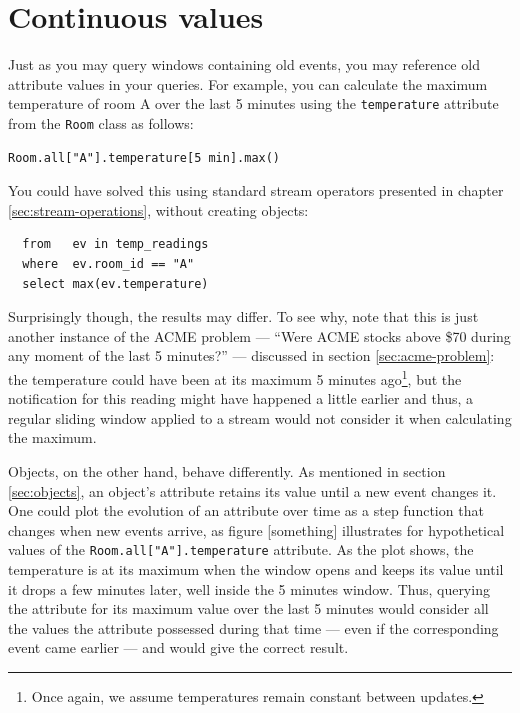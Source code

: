 \documentclass{report}
\begin{document}
\section{Continuous values}
\label{sec:continuous-values}

Just as you may query windows containing old events, you may reference
old attribute values in your queries. For example, you can calculate
the maximum temperature of room A over the last 5 minutes using the
\verb=temperature= attribute from the \verb=Room= class as follows:

\begin{verbatim}
Room.all["A"].temperature[5 min].max()
\end{verbatim}

You could have solved this using standard stream operators presented
in chapter \ref{sec:stream-operations}, without creating objects:

\begin{lstlisting}
  from   ev in temp_readings
  where  ev.room_id == "A"
  select max(ev.temperature)
\end{lstlisting}

Surprisingly though, the results may differ. To see why, note that
this is just another instance of the ACME problem --- ``Were ACME
stocks above \$70 during any moment of the last 5 minutes?'' ---
discussed in section \ref{sec:acme-problem}: the temperature could have
been at its maximum 5 minutes ago\footnote{Once again, we assume
  temperatures remain constant between updates.}, but the notification
for this reading might have happened a little earlier and thus, a
regular sliding window applied to a stream would not consider it when
calculating the maximum.

Objects, on the other hand, behave differently. As mentioned in
section \ref{sec:objects}, an object's attribute retains its value
until a new event changes it. One could plot the evolution of an
attribute over time as a step function that changes when new events
arrive, as figure [something] illustrates for hypothetical values of
the \verb=Room.all["A"].temperature= attribute. As the plot shows, the
temperature is at its maximum when the window opens and keeps its
value until it drops a few minutes later, well inside the 5 minutes
window. Thus, querying the attribute for its maximum value over the
last 5 minutes would consider all the values the attribute possessed
during that time --- even if the corresponding event came earlier ---
and would give the correct result.
\end{document}
